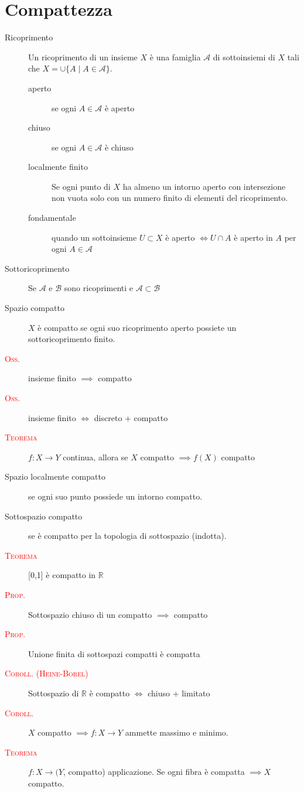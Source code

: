 \documentclass[a4paper,10pt]{article}
\newcommand{\myth}{\normalfont \scshape \textcolor{red}}
\theoremstyle{remark}
\theoremstyle{definition}
\begin{document}
\section*{Compattezza}
\begin{description}
    \item[Ricoprimento] Un ricoprimento di un insieme $X$ è una famiglia $\mathcal{A}$ di sottoinsiemi di $X$ tali che $X = \cup \{A \mid A\in \mathcal{A}\}$.
    \begin{description}
        \item[aperto] se ogni $A  \in \mathcal{A}$ è aperto
        \item[chiuso] se ogni $A  \in \mathcal{A}$ è chiuso
        \item[localmente finito] Se ogni punto di $X$ ha almeno un intorno aperto con intersezione non vuota solo con un numero finito di elementi del ricoprimento.
        \item[fondamentale] quando un sottoinsieme $U \subset X$ è aperto $\iff U \cap A$ è aperto in $A$ per ogni $A \in \mathcal{A}$ 
    \end{description}
    \item[Sottoricoprimento] Se $\mathcal{A}$ e $\mathcal{B}$ sono ricoprimenti e $\mathcal{A} \subset \mathcal{B}$
    \item[Spazio compatto] $X$ è compatto se ogni suo ricoprimento aperto possiete un sottoricoprimento finito.
    \item[\myth{Oss.}] insieme finito $\implies$ compatto
    \item[\myth{Oss.}] insieme finito $\iff$ discreto + compatto
    \item[\myth{Teorema}] $f: X \to Y$ continua, allora se $X$ compatto $\implies f(X)$ compatto
    
    \item[Spazio localmente compatto] se ogni suo punto possiede un intorno compatto.
    \item[Sottospazio compatto] se è compatto per la topologia di sottospazio (indotta).
    \item[\myth{Teorema}] [0,1] è compatto in $\mathbb{R}$
    \item[\myth{Prop.}] Sottospazio chiuso di un compatto $\implies$ compatto
    \item[\myth{Prop.}] Unione finita di sottospazi compatti è compatta
    \item[\myth{Coroll. (Heine-Borel)}] Sottospazio di $\mathbb{R}$ è compatto $\iff$ chiuso + limitato
    \item[\myth{Coroll.}] $X$ compatto $\implies f: X \to Y$ ammette massimo e minimo.
    \item[\myth{Teorema}] $f: X \to (Y$, compatto) applicazione. Se ogni fibra è compatta $\implies X$ compatto.
\end{description}
\end{document}
